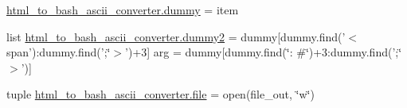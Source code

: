 \begin{DoxyCompactItemize}
\item 
\hyperlink{namespacehtml__to__bash__ascii__converter_a96e43cec76ccd1749dad1dfff3033b3a}{html\-\_\-to\-\_\-bash\-\_\-ascii\-\_\-converter.\-dummy} = item
\item 
list \hyperlink{namespacehtml__to__bash__ascii__converter_a99067e6cbccc1d304054ce4795e7a002}{html\-\_\-to\-\_\-bash\-\_\-ascii\-\_\-converter.\-dummy2} = dummy\mbox{[}dummy.\-find('$<$span')\-:dummy.\-find(';\char`\"{}$>$')+3\mbox{]} arg = dummy\mbox{[}dummy.\-find(\char`\"{}\-: \#\char`\"{})+3\-:dummy.\-find(';\char`\"{}$>$')\mbox{]}
\item 
tuple \hyperlink{namespacehtml__to__bash__ascii__converter_a581541bd272af45521cffc96b1460d6a}{html\-\_\-to\-\_\-bash\-\_\-ascii\-\_\-converter.\-file} = open(file\-\_\-out, \char`\"{}w\char`\"{})
\end{DoxyCompactItemize}
